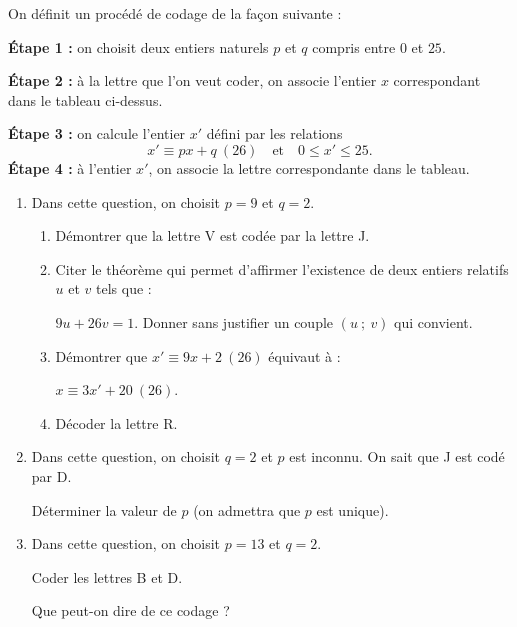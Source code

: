 \documentclass{cornouaille}
\begin{document}
\begin{exercice}
On définit un procédé de codage de la façon suivante :

\textbf{Étape 1 :} on choisit deux entiers naturels $p$ et $q$ compris entre $0$ et $25$.

\textbf{Étape 2 :} à la lettre que l'on veut coder, on associe l'entier $x$ correspondant dans le tableau ci-dessus.

\textbf{Étape 3 :} on calcule l'entier $x'$ défini par les relations 
$$x' \equiv  px + q~(26)\quad \text{et}\quad  0\leq x'\leq 25.$$
\textbf{Étape 4 :} à l'entier $x'$, on associe la lettre correspondante dans le tableau.


\begin{enumerate}
\item Dans cette question, on choisit $p = 9$ et $q = 2$.
  \begin{enumerate}
  \item Démontrer que la lettre V est codée par la lettre J.
  \item Citer le théorème qui permet d'affirmer l'existence de deux
    entiers relatifs $u$ et $v$ tels que :
		
    $9u + 26v = 1$. Donner sans justifier un couple $(u\ ;\ v)$ qui
    convient.
  \item Démontrer que $x' \equiv 9x + 2~(26)$ équivaut à :
		
    $x \equiv 3x' + 20~(26)$.
  \item Décoder la lettre R.
  \end{enumerate}
\item Dans cette question, on choisit $q = 2$ et $p$ est inconnu. On
  sait que J est codé par D.
	
  Déterminer la valeur de $p$ (on admettra que $p$ est unique).
\item Dans cette question, on choisit $p = 13$ et $q = 2$. 

  Coder les lettres B et D. 

  Que peut-on dire de ce codage ?
\end{enumerate}
\end{exercice}

\end{document}
